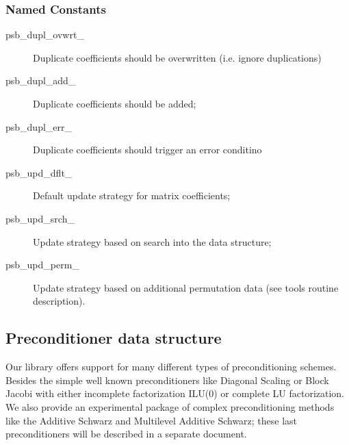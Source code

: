 \subsubsection{Named Constants}
\label{sec:sp_constants}
\begin{description}
\item[psb\_dupl\_ovwrt\_] Duplicate coefficients should be overwritten
  (i.e. ignore duplications)
\item[psb\_dupl\_add\_] Duplicate coefficients should be added;	         
\item[psb\_dupl\_err\_] Duplicate coefficients should trigger an error conditino
\item[psb\_upd\_dflt\_] Default update strategy for matrix coefficients;
\item[psb\_upd\_srch\_] Update strategy based on search into the data structure;
\item[psb\_upd\_perm\_] Update strategy based on additional
  permutation data (see tools routine description).
\end{description}



\subsection{Preconditioner data structure}
\label{sec:prec}
Our library  offers support for  many different types of
preconditioning schemes. Besides the simple well known preconditioners
like Diagonal Scaling or Block Jacobi with either  incomplete
factorization ILU(0) or complete LU factorization.  We also provide an
experimental package of  complex 
preconditioning methods like the Additive Schwarz and Multilevel
Additive Schwarz; these last preconditioners will be described in a
separate document. 

